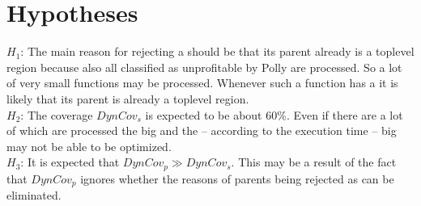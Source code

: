 \section{Hypotheses}
\(H_1\): The main reason for rejecting a \scop should be that its parent already is a toplevel region because also all \scops classified as unprofitable by Polly are processed.
So a lot of very small functions may be processed.
Whenever such a function has a \scop it is likely that its parent is already a toplevel region.\\
\(H_2\): The coverage \(DynCov_s\) is expected to be about 60\%.
Even if there are a lot of \scops which are processed the big \scops and the -- according to the execution time -- big \scops may not be able to be optimized.\\
\(H_3\): It is expected that \(DynCov_p \gg DynCov_s\).
This may be a result of the fact that \(DynCov_p\) ignores whether the reasons of parents being rejected as \scop can be eliminated.

